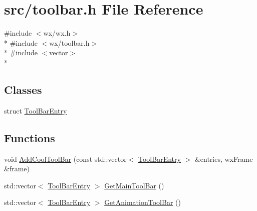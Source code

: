 \hypertarget{a00247}{\section{src/toolbar.h File Reference}
\label{a00247}
}
{\ttfamily \#include $<$wx/wx.\-h$>$}\\*
{\ttfamily \#include $<$wx/toolbar.\-h$>$}\\*
{\ttfamily \#include $<$vector$>$}\\*
\subsection*{Classes}
\begin{DoxyCompactItemize}
\item 
struct \hyperlink{a00145}{Tool\-Bar\-Entry}
\end{DoxyCompactItemize}
\subsection*{Functions}
\begin{DoxyCompactItemize}
\item 
void \hyperlink{a00247_aa7c5ee2c49b381579f495b0194177f13}{Add\-Cool\-Tool\-Bar} (const std\-::vector$<$ \hyperlink{a00145}{Tool\-Bar\-Entry} $>$ \&entries, wx\-Frame \&frame)
\item 
std\-::vector$<$ \hyperlink{a00145}{Tool\-Bar\-Entry} $>$ \hyperlink{a00247_ac022268365dbe9564565f03416136e37}{Get\-Main\-Tool\-Bar} ()
\item 
std\-::vector$<$ \hyperlink{a00145}{Tool\-Bar\-Entry} $>$ \hyperlink{a00247_a0405689ffdc482e4b9b5383c789ff9bc}{Get\-Animation\-Tool\-Bar} ()
\end{DoxyCompactItemize}



